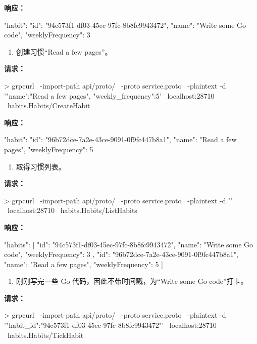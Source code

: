 \noindent\textbf{响应：}
\begin{shellcode}[]
{
  "habit": {
    "id": "94c573f1-df03-45ec-97fc-8b8fc9943472",
    "name": "Write some Go code",
    "weeklyFrequency": 3
  }
}
\end{shellcode}

\begin{enumerate}[resume]
  \item 创建习惯“Read a few pages”。
\end{enumerate}

\noindent\textbf{请求：}
\begin{shellcode}[]
> grpcurl \
-import-path api/proto/ \
-proto service.proto \
-plaintext -d '{"name":"Read a few pages", "weekly_frequency":5}' \
localhost:28710 \
habits.Habits/CreateHabit
\end{shellcode}

\noindent\textbf{响应：}
\begin{shellcode}[]
{
  "habit": {
    "id": "96b72dce-7a2e-43ce-9091-0f9fc447b8a1",
    "name": "Read a few pages",
    "weeklyFrequency": 5
  }
}
\end{shellcode}

\begin{enumerate}[resume]
  \item 取得习惯列表。
\end{enumerate}

\noindent\textbf{请求：}
\begin{shellcode}[]
> grpcurl \
-import-path api/proto/ \
-proto service.proto \
-plaintext -d '{}' \
localhost:28710 \
habits.Habits/ListHabits
\end{shellcode}

\noindent\textbf{响应：}
\begin{shellcode}[]
{
  "habits": [
    {
      "id": "94c573f1-df03-45ec-97fc-8b8fc9943472",
      "name": "Write some Go code",
      "weeklyFrequency": 3
    },
    {
      "id": "96b72dce-7a2e-43ce-9091-0f9fc447b8a1",
      "name": "Read a few pages",
      "weeklyFrequency": 5
    }
  ]
}
\end{shellcode}

\begin{enumerate}[resume]
  \item 刚刚写完一些 Go 代码，因此不带时间戳，为“Write some Go code”打卡。
\end{enumerate}

\noindent\textbf{请求：}
\begin{shellcode}[]
> grpcurl \
-import-path api/proto/ \
-proto service.proto \
-plaintext -d '{"habit_id":"94c573f1-df03-45ec-97fc-8b8fc9943472"}' \
localhost:28710 \
habits.Habits/TickHabit
\end{shellcode}

